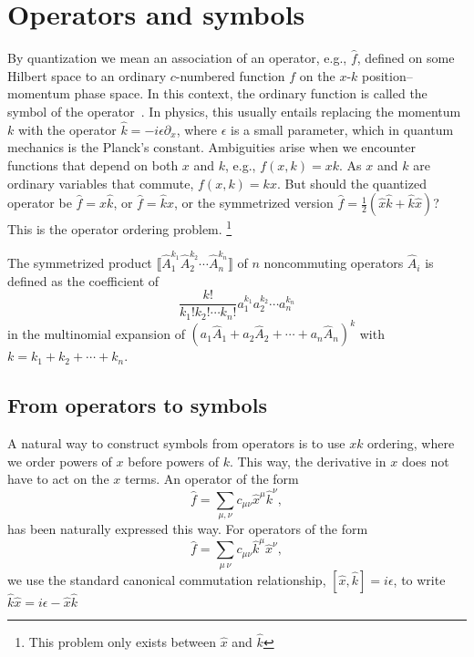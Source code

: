 
\section{Operators and symbols}

By quantization we mean an association of an operator, e.g., $\hat{f}$, defined on some Hilbert space to an ordinary $c$-numbered function $f$ on the $x$-$k$ position--momentum phase space.
In this context, the ordinary function is called the symbol of the operator~\cite[\S 2.3.1]{chaichian2001}.
In physics, this usually entails replacing the momentum $k$ with the operator $\hat{k} = -i\epsilon\partial_{x}$, where $\epsilon$ is a small parameter, which in quantum mechanics is the Planck's constant.
Ambiguities arise when we encounter functions that depend on both $x$ and $k$, e.g., $f(x, k) = xk$.
As $x$ and $k$ are ordinary variables that commute, $f(x, k) = kx$.
But should the quantized operator be $\hat{f} = x\hat{k}$, or $\hat{f} = \hat{k}x$, or the symmetrized version $\hat{f} = \tfrac{1}{2}\left(\hat{x}\hat{k} + \hat{k}\hat{x}\right)$?
This is the operator ordering problem.%
\footnote{This problem only exists between $\hat{x}$ and $\hat{k}$ }

The symmetrized product $\big\llbracket \widehat{A}_{1}^{k_{1}} \widehat{A}_{2}^{k_{2}} \cdots \widehat{A}_{n}^{k_n} \big\rrbracket$ of $n$ noncommuting operators $\widehat{A}_{i}$ is defined as the coefficient of
%
\begin{equation}
  \frac{k!}{k_{1}!k_{2}!\cdots k_{n}!} a_{1}^{k_{1}} a_{2}^{k_{2}} \cdots a_{n}^{k_{n}}
\end{equation}
%
in the multinomial expansion of $\left(a_{1}\widehat{A}_{1} + a_{2}\widehat{A}_{2} + \cdots + a_{n}\widehat{A}_{n}\right)^{k}$ with $k = k_{1} + k_{2} + \cdots + k_{n}$.

\subsection{From operators to symbols}

A natural way to construct symbols from operators is to use $xk$ ordering, where we order powers of $x$ before powers of $k$.
This way, the derivative in $x$ does not have to act on the $x$ terms.
An operator of the form 
%
\begin{equation}
  \hat{f} = \sum_{\mu,\nu} c_{\mu\nu} \hat{x}^{\mu}\hat{k}^{\nu},
\end{equation}
%
has been naturally expressed this way.
For operators of the form
%
\begin{equation}
  \hat{f} = \sum_{\mu\,\nu} c_{\mu\nu} \hat{k}^{\mu}\hat{x}^{\nu},
\end{equation}
%
we use the standard canonical commutation relationship, $[\hat{x}, \hat{k}] = i\epsilon$, to write $\hat{k}\hat{x} = i\epsilon - \hat{x}\hat{k}$


